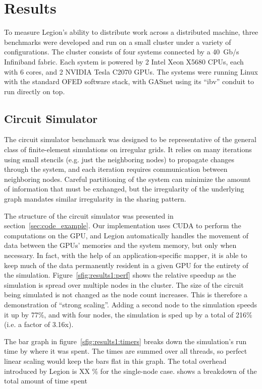 \section{Results}

To measure Legion's ability to distribute work across a distributed machine, 
three benchmarks were developed and run on a small cluster under a variety
of configurations.  The cluster consists of four systems connected by a 40~Gb/s
Infiniband fabric.  Each system is powered by 2 Intel Xeon X5680 CPUs, each
with 6 cores, and 2 NVIDIA Tesla C2070 GPUs.  The systems were running Linux
with the standard OFED software stack, with GASnet using its ``ibv'' conduit
to run directly on top.

\subsection{Circuit Simulator}

The circuit simulator benchmark was designed to be representative of the
general class of finite-element simulations on irregular grids.  It relies
on many iterations using small stencils (e.g. just the neighboring nodes) to
propagate changes through the system, and each iteration requires communication
between neighboring nodes.  Careful partitioning of the system can minimize
the amount of information that must be exchanged, but the irregularity of the
underlying graph mandates similar irregularity in the sharing pattern.

The structure of the circuit simulator was presented in section~\ref{sec:code_example}.  Our implementation uses CUDA to perform the computations on the GPU, and Legion
automatically handles the movement of data between the GPUs' memories and the
system memory, but only when necessary.  In fact, with the help of an
application-specific mapper, it is able to keep much of
the data permanently resident in a given GPU for the entirety of the simulation.
Figure~\ref{sfig:results1:perf} shows the relative speedup as the simulation is
spread over multiple nodes in the cluster.  The size of the circuit
being simulated is not changed as the node count increases.  This is therefore
a demonstration of ``strong scaling''.  Adding a second node to the simulation
speeds it up by 77\%, and with four nodes, the simulation is sped up by a total
of 216\% (i.e. a factor of 3.16x).

The bar graph in figure~\ref{sfig:results1:timers} breaks down the simulation's
run time by where it was spent.  The times are summed over all threads, so 
perfect linear scaling would keep the bars flat in this graph.  The total
overhead introduced by Legion is XX \% for the single-node case.
shows a breakdown of the
total amount of time spent 

